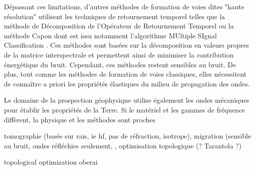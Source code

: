 Dépassant ces limitations, d'autres méthodes de formation de voies dites "haute résolution" utilisent les techniques de retournement temporel telles que la méthode de Décomposition de l'Opérateur de Retournement Temporel \citep{prada_dort} ou la méthode Capon \citep{capon} dont est issu notamment l'algorithme MUltiple SIgnal Classification \citep{schmidt}. Ces méthodes sont basées sur la décomposition en valeurs propres de la matrice interspectrale et permettent ainsi de minimiser la contribution énergétique du bruit. Cependant, ces méthodes restent sensibles au bruit. De plus, tout comme les méthodes de formation de voies classiques, elles nécessitent de connaître a priori les propriétés élastiques du milieu de propagation des ondes.





Le domaine de la prospection géophysique utilise également les ondes mécaniques pour établir les propriétés de la Terre. Si le matériel et les gammes de  fréquence diffèrent, la physique et les méthodes sont proches


tomographie (basée sur rais, ie hf, pas de réfraction, isotrope), migration (sensible au bruit, ondes réfléchies seulement, , optimisation topologique (? Tarantola ?)

topological optimization
oberai



	

